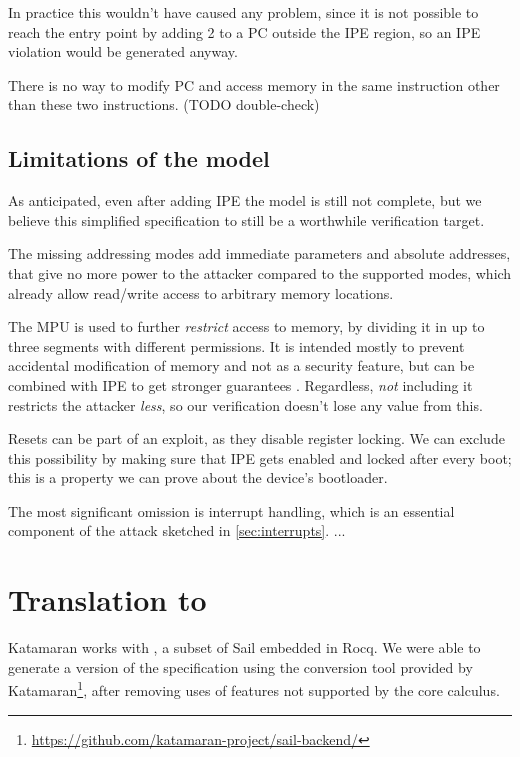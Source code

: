In practice this wouldn't have caused any problem, since it is not possible to reach the entry point by adding 2 to a PC outside the IPE region, so an IPE violation would be generated anyway.  %

There is no way to modify PC and access memory in the same instruction other than these two instructions. (TODO double-check)

\subsection{Limitations of the model}
\label{sec:model-limitations}

As anticipated, even after adding IPE the model is still not complete, but we believe this simplified specification to still be a worthwhile verification target.

The missing addressing modes add immediate parameters and absolute addresses, that give no more power to the attacker compared to the supported modes, which already allow read/write access to arbitrary memory locations.

The MPU is used to further \emph{restrict} access to memory, by dividing it in up to three segments with different permissions. It is intended mostly to prevent accidental modification of memory and not as a security feature, but can be combined with IPE to get stronger guarantees \cite{Bognar2024}. Regardless, \emph{not} including it restricts the attacker \emph{less}, so our verification doesn't lose any value from this.

Resets can be part of an exploit, as they disable register locking. We can exclude this possibility by making sure that IPE gets enabled and locked after every boot; this is a property we can prove about the device's bootloader.

The most significant omission is interrupt handling, which is an essential component of the attack sketched in \cref{sec:interrupts}. ...

\section{Translation to \texorpdfstring{\usail}{μSail}}

Katamaran works with \usail, a subset of Sail embedded in Rocq. We were able to generate a \usail version of the specification using the conversion tool provided by Katamaran\footnote{\url{https://github.com/katamaran-project/sail-backend/}}, after removing uses of features not supported by the core calculus.

